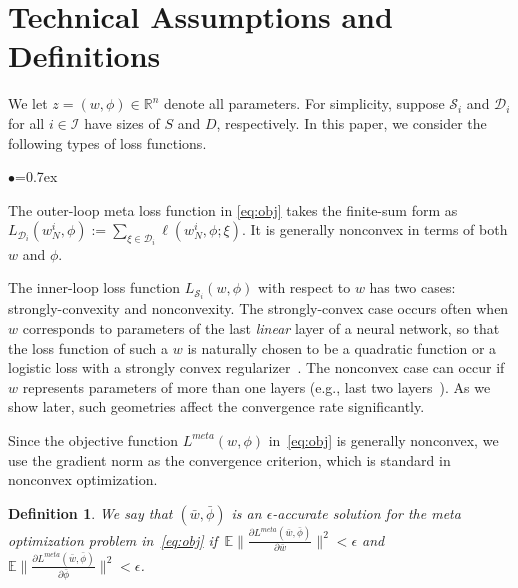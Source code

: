 \documentclass{osudissert96}
\newtheorem{definition}{Definition}
\begin{document}
\section{Technical Assumptions and Definitions}\label{se:pre} 
We let $z=(w,\phi)\in\mathbb{R}^{n}$ denote all parameters. For simplicity, suppose $\mathcal{S}_i$ and $\mathcal{D}_i$ for all $i\in\mathcal{I}$ have sizes of $S$ and $D$, respectively. In this paper, we consider the following types of loss functions.
\begin{list}{$\bullet$}{\topsep=0.7ex \leftmargin=0.32in \rightmargin=0.2in \itemsep =0.05in}

\item The outer-loop meta loss function in \cref{eq:obj} takes the finite-sum form as $L_{\mathcal{D}_i}(w^i_N, \phi):=\sum_{\xi \in \mathcal{D}_i } \ell (w^i_N,\phi; \xi)$. It is generally nonconvex in terms of both $w$ and $\phi$.

\item The inner-loop loss function $L_{\mathcal{S}_i}(w,\phi)$ with respect to $w$ has two cases: strongly-convexity and nonconvexity. The strongly-convex case occurs often when $w$ corresponds to parameters of the last {\em linear} layer of a neural network, so that the loss function of such a $w$ is naturally chosen to be a quadratic function or a logistic loss with a strongly convex regularizer~\cite{bertinetto2018meta,lee2019meta}. The nonconvex case can occur if $w$ represents parameters of more than one layers (e.g., last two layers~\cite{raghu2019rapid}). As we show later, such geometries affect the convergence rate significantly.
\vspace{0.1cm}
\end{list}
Since the objective function $L^{meta}(w,\phi)$ in~\cref{eq:obj} is generally nonconvex, we use the gradient norm as the convergence criterion, which is standard in nonconvex optimization.
\begin{definition}
We say that $(\bar{w},\bar{\phi})$ is an $\epsilon$-accurate solution for the meta optimization problem in~\cref{eq:obj} if 
{\small $\,\mathbb{E}\Big\| \frac{\partial L^{meta}(\bar{w},\bar{\phi})}{\partial \bar w}\Big\|^2 <\epsilon$ and $\mathbb{E}\Big\| \frac{\partial L^{meta}(\bar{w},\bar{\phi})}{\partial \bar \phi}\Big\|^2 <\epsilon$}.
\end{definition}
\end{document}
